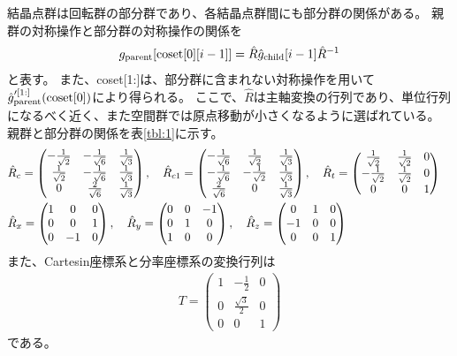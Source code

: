 \documentclass[11pt]{easymemo}
\begin{document}
結晶点群は回転群の部分群であり、各結晶点群間にも部分群の関係がある。
親群の対称操作と部分群の対称操作の関係を
\begin{align}
g_{\rm parent}[{\rm coset}[0][i-1]]=\hat{R}\hat{g}_{\rm child}[i-1]\hat{R}^{-1}
\end{align}
と表す。
また、coset[1:]は、部分群に含まれない対称操作を用いて$\hat{g}_{\rm parent}'^{[1:]}({\rm coset}[0])$により得られる。
ここで、$\hat{R}$は主軸変換の行列であり、単位行列になるべく近く、また空間群では原点移動が小さくなるように選ばれている。
親群と部分群の関係を表\ref{tbl:1}に示す。
\begin{align}
&
\hat{R}_c = \begin{pmatrix}
-\frac{1}{\sqrt{2}} & -\frac{1}{\sqrt{6}} & \frac{1}{\sqrt{3}} \\
\frac{1}{\sqrt{2}} & -\frac{1}{\sqrt{6}} & \frac{1}{\sqrt{3}} \\
0 & \frac{2}{\sqrt{6}} & \frac{1}{\sqrt{3}}
\end{pmatrix},
\quad
\hat{R}_{c1} = \begin{pmatrix} -\frac{1}{\sqrt{6}} & \frac{1}{\sqrt{2}} & \frac{1}{\sqrt{3}} \\
-\frac{1}{\sqrt{6}} & -\frac{1}{\sqrt{2}} & \frac{1}{\sqrt{3}} \\
\frac{2}{\sqrt{6}} & 0 & \frac{1}{\sqrt{3}}
\end{pmatrix},
\quad
\hat{R}_t = \begin{pmatrix} \frac{1}{\sqrt{2}} & \frac{1}{\sqrt{2}} & 0 \\
-\frac{1}{\sqrt{2}} & \frac{1}{\sqrt{2}} & 0 \\
0 & 0 & 1
\end{pmatrix}
\cr&
\hat{R}_x = \begin{pmatrix} 1 & 0 & 0 \\ 0 & 0 & 1 \\ 0 & -1 & 0 \end{pmatrix},
\quad
\hat{R}_y = \begin{pmatrix} 0 & 0 & -1 \\ 0 & 1 & 0 \\ 1 & 0 & 0 \end{pmatrix},
\quad
\hat{R}_z = \begin{pmatrix} 0 & 1 & 0 \\ -1 & 0 & 0 \\ 0 & 0 & 1 \end{pmatrix}
\end{align}
また、Cartesin座標系と分率座標系の変換行列は
\begin{align}
T = \begin{pmatrix} 1 & -\frac{1}{2} & 0 \\ 0 & \frac{\sqrt{3}}{2} & 0 \\ 0 & 0 & 1 \end{pmatrix}
\end{align}
である。
\end{document}
